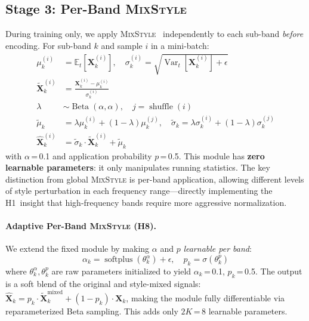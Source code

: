 \documentclass[conference]{IEEEtran}
\newcommand{\mixstyle}{\textsc{MixStyle}}
\begin{document}
\subsection{Stage 3: Per-Band \mixstyle{}}
\label{sec:mixstyle}
During training only, we apply \mixstyle{}~\cite{zhou2021mixstyle} independently to each sub-band \emph{before} encoding.
For sub-band $k$ and sample $i$ in a mini-batch:
\begin{align}
\mu_k^{(i)} &= \mathbb{E}_t[\mathbf{X}_k^{(i)}], \quad
\sigma_k^{(i)} = \sqrt{\operatorname{Var}_t[\mathbf{X}_k^{(i)}] + \epsilon} \label{eq:ms_stats} \\
\tilde{\mathbf{X}}_k^{(i)} &= \frac{\mathbf{X}_k^{(i)} - \mu_k^{(i)}}{\sigma_k^{(i)}} \label{eq:ms_norm} \\
\lambda &\sim \operatorname{Beta}(\alpha, \alpha), \quad j = \operatorname{shuffle}(i) \label{eq:ms_lambda} \\
\tilde{\mu}_k &= \lambda \mu_k^{(i)} + (1-\lambda) \mu_k^{(j)}, \quad
\tilde{\sigma}_k = \lambda \sigma_k^{(i)} + (1-\lambda) \sigma_k^{(j)} \label{eq:ms_mix} \\
\hat{\mathbf{X}}_k^{(i)} &= \tilde{\sigma}_k \cdot \tilde{\mathbf{X}}_k^{(i)} + \tilde{\mu}_k \label{eq:ms_out}
\end{align}
with $\alpha$\,=\,0.1 and application probability $p$\,=\,0.5.
This module has \textbf{zero learnable parameters}: it only manipulates running statistics.
The key distinction from global \mixstyle{} is per-band application, allowing different levels of style perturbation in each frequency range---directly implementing the H1~insight that high-frequency bands require more aggressive normalization.

\paragraph{Adaptive Per-Band \mixstyle{} (H8).}
We extend the fixed module by making $\alpha$ and $p$ \emph{learnable per band}:
\begin{equation}
\alpha_k = \operatorname{softplus}(\theta_k^{\alpha}) + \epsilon, \quad
p_k = \sigma(\theta_k^{p})
\label{eq:adaptive_ms}
\end{equation}
where $\theta_k^{\alpha}, \theta_k^{p}$ are raw parameters initialized to yield $\alpha_k$\,=\,0.1, $p_k$\,=\,0.5.
The output is a soft blend of the original and style-mixed signals:
$\hat{\mathbf{X}}_k = p_k \cdot \tilde{\mathbf{X}}_k^{\mathrm{mixed}} + (1 - p_k) \cdot \mathbf{X}_k$,
making the module fully differentiable via reparameterized Beta sampling.
This adds only $2K$\,=\,8 learnable parameters.
\end{document}
